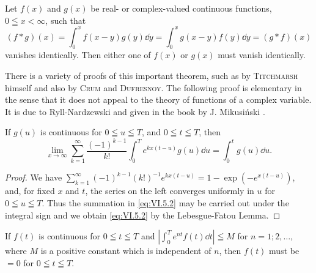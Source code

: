 \begin{theoremn} Let $f(x)$ and $g(x)$ be real- or complex-valued continuous functions, $0 \leqq x < \infty$, such that
\begin{equation}\label{eq:VI.5.1}
(f * g) (x) = \int_{0} ^{x} f (x - y) g (y) \dd y = \int_{0} ^{x} g (x - y) f (y) \dd y = (g * f) (x)
\end{equation}
vanishes identically. Then either one of $f(x)$ or $g(x)$ must vanish identically. 

There is a variety of proofs of this important theorem, such as by \textsc{Titchmarsh} \cite{titchmarsh323} himself and also by \textsc{Crum} and \textsc{Dufresnoy}. The following proof is elementary in the sense that it does not appeal to the theory of functions of a complex variable. It is due to Ryll-Nardzewski \cite{ryllnardzewski279} and given in the book by J. Mikusiński \cite{mikusinski196}. 

\end{theoremn}
\begin{lemma}\label{lem:VI.5.Lemma.1} If $g(u)$ is continuous for $0 \leqq u \leqq T$, and $0 \leqq t \leqq T$, then 
\begin{equation}\label{eq:VI.5.2}
\lim\limits _{x \rightarrow \infty} \sum\limits_{k=1} ^{\infty} \frac {(- 1) ^{k-1}}{k !} \int_{0} ^{T} e ^{kx(t-u)} g (u) \dd u = \int_{0} ^{t} g (u) \dd u.
\end{equation}
\end{lemma}

\begin{proof}
 We have $\sum\limits_{k=1}^{\infty} (-1)^{k-1} (k!)^{-1} e^{kx(t-u)} = 1 - \exp(-e^{x(t-u)})$, and, for fixed $x$ and $t$, the series on the left converges uniformly in $u$ for $0 \leqq u \leqq T$. Thus the summation in \eqref{eq:VI.5.2} may be carried out under the integral sign and we obtain \eqref{eq:VI.5.2} by the Lebesgue-Fatou Lemma. 
\end{proof}

\begin{lemma}\label{lem:VI.5.Lemma.2} If $f(t)$ is continuous for $0 \leqq t \leqq T$ and $\left| \int_{0}^{T} e^{nt} f(t) \dd t \right| \leqq M$ for $n = 1; 2, \ldots$, where $M$ is a positive constant which is independent of $n$, then $f(t)$ must be $= 0$ for $0 \leqq t \leqq T$. 
\end{lemma}

